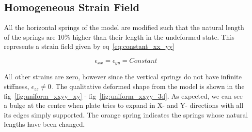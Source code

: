  \subsection{Homogeneous Strain Field}
 All the horizontal springs of the model are modified such that the natural length of the springs are 10\% higher than their length in the undeformed state. This represents a strain field given by eq~\ref{eq:constant_xx_yy}
 
\begin{equation}
    \epsilon_{xx} = \epsilon_{yy} = Constant
    \label{eq:constant_xx_yy}
\end{equation}

All other strains are zero, however since the vertical springs do not have infinite stiffness, $\epsilon_{zz} \neq 0$. The qualitative deformed shape from the model is shown in the fig~\ref{fig:uniform_xxyy_xy} - fig~\ref{fig:uniform_xxyy_3d}. As expected, we can see a bulge at the centre when plate tries to expand in X- and Y- directions with all its edges simply supported.  The orange spring indicates the springs whose natural lengths have been changed.

